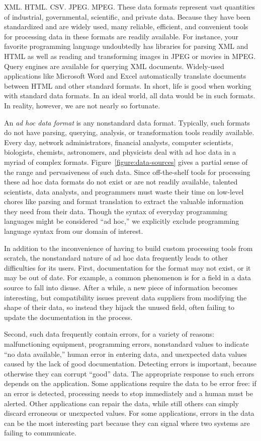 XML. HTML. CSV. JPEG. MPEG.  These data formats
represent vast quantities of industrial, governmental,
scientific, and private data.  Because they have been standardized
and are widely used, many reliable, efficient, and
convenient tools for processing data in these formats are
readily available.  For instance, your favorite programming language
undoubtedly has libraries for parsing XML and HTML as well as
reading and transforming images in JPEG or movies in MPEG.  Query engines
are available for querying XML documents.
Widely-used applications like Microsoft Word and Excel automatically
translate documents between HTML and other
standard formats.  In short, life is good when working with standard data formats. In an ideal world, all data would be in such formats. In reality, however, we are not nearly so fortunate.

An {\em ad hoc data format} is any nonstandard data format.  
Typically, such formats do not have parsing,
querying, analysis, or transformation tools readily available.
Every day, network administrators, financial analysts, computer
scientists, biologists, 
chemists, astronomers, and
physicists deal with ad hoc data in a myriad of complex formats.
Figure~\ref{figure:data-sources} gives a partial sense of the range
and pervasiveness of such data.  Since off-the-shelf
tools for processing these ad hoc data formats do not exist
or are not readily available, talented scientists, data analysts, and
programmers must waste their time 
on low-level chores like parsing and format translation
to extract the valuable information they need from their data.
Though the syntax of everyday programming languages
might be considered ``ad hoc,'' we explicitly exclude
programming language syntax from our domain of interest.

In addition to the inconvenience of having to build custom
processing tools from scratch, the nonstandard nature of ad hoc data
frequently leads to other difficulties for its users.
First, documentation for the format may not exist, or it may be out of
date.  For example, a common phenomenon is for a field in a data source to fall
into disuse.  After a while, a new piece of information becomes
interesting, but compatibility issues prevent data suppliers from
modifying the shape of their data, so instead they hijack the unused
field, often failing to update the documentation in the process.

Second, such data frequently contain errors, for a variety of reasons:
malfunctioning equipment, programming errors, nonstandard values to
indicate ``no data available,'' human error in entering data, and
unexpected data values caused by the lack of good documentation.
Detecting errors is important, because otherwise they can corrupt
``good'' data.  The appropriate response to such errors depends on the
application. Some applications require the data to be error free: if
an error is detected, processing needs to stop immediately and a human
must be alerted.  Other applications can repair the data, while still
others can simply discard erroneous or unexpected values.  For some
applications, errors in the data can be the most interesting part
because they can signal where two systems are failing to communicate.

